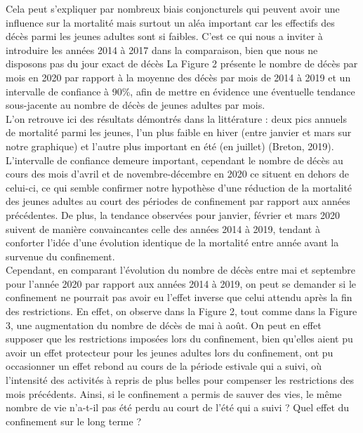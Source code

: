 \documentclass[titlepage]{article}
\begin{document}

Cela peut s'expliquer par nombreux biais conjoncturels qui peuvent avoir une influence sur la mortalité mais surtout un aléa important car les effectifs des décès parmi les jeunes adultes sont si faibles. C'est ce qui nous a inviter à introduire les années 2014 à 2017 dans la comparaison, bien que nous ne disposons pas du jour exact de décès La Figure 2 présente le nombre de décès par mois en 2020 par rapport à la moyenne des décès par mois de 2014 à 2019 et un intervalle de confiance à 90\%, afin de mettre en évidence une éventuelle tendance sous-jacente au nombre de décès de jeunes adultes par mois. \\

L'on retrouve ici des résultats démontrés dans la littérature : deux pics annuels de mortalité parmi les jeunes, l'un plus faible en hiver (entre janvier et mars sur notre graphique) et l'autre plus important en été (en juillet) (Breton, 2019). L'intervalle de confiance demeure important, cependant le nombre de décès au cours des mois d'avril et de novembre-décembre en 2020 ce situent en dehors de celui-ci, ce qui semble confirmer notre hypothèse d'une réduction de la mortalité des jeunes adultes au court des périodes de confinement par rapport aux années précédentes. De plus, la tendance observées pour janvier, février et mars 2020 suivent de manière convaincantes celle des années 2014 à 2019, tendant à conforter l'idée d'une évolution identique de la mortalité entre année avant la survenue du confinement. \\

Cependant, en comparant l'évolution du nombre de décès entre mai et septembre pour l'année 2020 par rapport aux années 2014 à 2019, on peut se demander si le confinement ne pourrait pas avoir eu l'effet inverse que celui attendu après la fin des restrictions. En effet, on observe dans la Figure 2, tout comme dans la Figure 3, une augmentation du nombre de décès de mai à août. On peut en effet supposer que les restrictions imposées lors du confinement, bien qu'elles aient pu avoir un effet protecteur pour les jeunes adultes lors du confinement, ont pu occasionner un effet rebond au cours de la période estivale qui a suivi, où l'intensité des activités à repris de plus belles pour compenser les restrictions des mois précédents. Ainsi, si le confinement a permis de sauver des vies, le même nombre de vie n'a-t-il pas été perdu au court de l'été qui a suivi ? Quel effet du confinement sur le long terme ? \\
\end{document}
